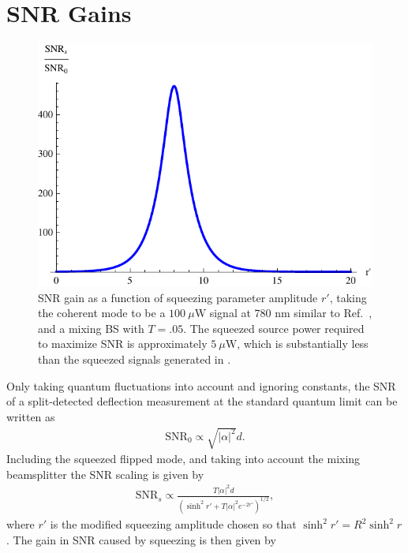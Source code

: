 \section{SNR Gains}
\begin{figure}
  \begin{center}
    \includegraphics[width=\columnwidth]{./SqueezedLight/figures/squeezedsnrgain.pdf}
  \end{center}
  \caption[SNR gain as a function of the real part of the squeezing parameter.]{SNR gain as a function of squeezing parameter amplitude $r'$, taking the coherent mode to be a $100 \: \mu \text{W}$ signal at $780 \text{ nm}$ similar to Ref.~\cite{Dixon2009}, and a mixing BS with $T=.05$.  The squeezed source power required to maximize SNR is approximately $5 \: \mu \text{W}$, which is substantially less than the squeezed signals generated in \cite{Vahlbruch2005,Vahlbruch2008}. }  
  \label{fig:squeezedsnrgain}
\end{figure}
Only taking quantum fluctuations into account and ignoring constants, the SNR of a split-detected deflection measurement at the standard quantum limit can be written as \cite{Barnett2003}
\begin{align}
\text{SNR}_0 \propto \sqrt{|\alpha |^2} d .
\end{align}
Including the squeezed flipped mode, and taking into account the mixing beamsplitter the SNR scaling is given by
\begin{align}
\text{SNR}_s \propto \frac{T|\alpha |^2 d}{(\sinh^2 r' + T|\alpha |^2 e^{-2r'})^{1/2}},
\end{align}
where $r'$ is the modified squeezing amplitude chosen so that $\sinh^2 r' = R^2 \sinh^2 r$.  The gain in SNR caused by squeezing is then given by
